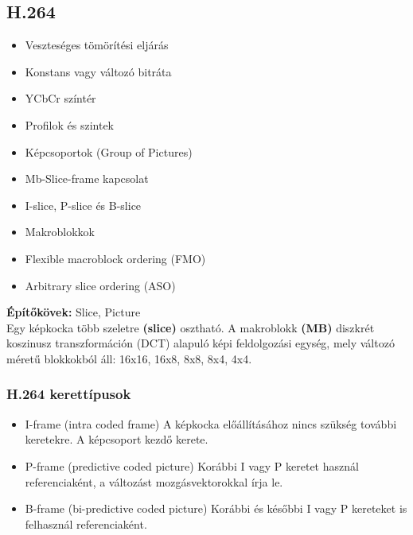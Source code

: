\documentclass[10pt,a4paper]{article}
\begin{document}
\subsection{H.264}
\begin{itemize}
	\item Veszteséges tömörítési eljárás
	\item Konstans vagy változó bitráta
	\item YCbCr színtér
	\item Profilok és szintek
	\item Képcsoportok (Group of Pictures)
	\item Mb-Slice-frame kapcsolat
	\item I-slice, P-slice és B-slice
	\item Makroblokkok
	\item Flexible macroblock ordering (FMO)
	\item Arbitrary slice ordering (ASO)
\end{itemize}
\textbf{Építőkövek:} Slice, Picture\\
Egy képkocka több szeletre \textbf{(slice)} osztható. A makroblokk \textbf{(MB)} diszkrét
koszinusz transzformáción (DCT) alapuló képi feldolgozási egység, mely
változó méretű blokkokból áll: 16x16, 16x8, 8x8, 8x4, 4x4.

\subsubsection{H.264 kerettípusok}
\begin{itemize}
	\item I-frame (intra coded frame)
	A képkocka előállításához nincs szükség
	további keretekre. A képcsoport kezdő kerete.
	\item P-frame (predictive coded picture)
	Korábbi I vagy P keretet használ referenciaként,
	a változást mozgásvektorokkal írja le.
	\item B-frame (bi-predictive coded picture)
	Korábbi és későbbi I vagy P kereteket is
	felhasznál referenciaként.
\end{itemize}
\end{document}
